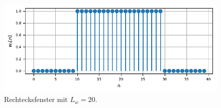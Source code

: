 
\begin{figure}
    \centering
    \includegraphics{papers/sonogramm/images/rect_time.pdf}
    \caption{Rechtecksfenster mit $L_w = 20$.
    \label{sonogramm:recttime}
    }
\end{figure}

